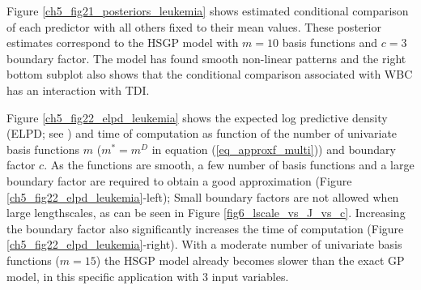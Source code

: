 \documentclass[onecolumn,a4paper,11pt]{article}
\begin{document}
Figure \ref{ch5_fig21_posteriors_leukemia} shows estimated conditional comparison of each predictor with all others fixed to their mean values. These posterior estimates correspond to the HSGP model with $m=10$ basis functions and $c=3$ boundary factor. The model has found smooth non-linear patterns and the right bottom subplot also shows that the conditional comparison associated with WBC has an interaction with TDI.


Figure \ref{ch5_fig22_elpd_leukemia} shows the expected log predictive density (ELPD; see \cite{vehtari_2012}) and time of computation as function of the number of univariate basis functions $m$ ($m^{\ast}=m^D$ in equation (\ref{eq_approxf_multi})) and boundary factor $c$. As the functions are smooth, a few number of basis functions and a large boundary factor are required to obtain a good approximation (Figure \ref{ch5_fig22_elpd_leukemia}-left); Small boundary factors are not allowed when large lengthscales, as can be seen in Figure \ref{fig6_lscale_vs_J_vs_c}. Increasing the boundary factor also significantly increases the time of computation (Figure \ref{ch5_fig22_elpd_leukemia}-right). {\color{blue} With a moderate number of univariate basis functions ($m=15$) the HSGP model already becomes slower than the exact GP model, in this specific application with $3$ input variables.}
%
\end{document}
